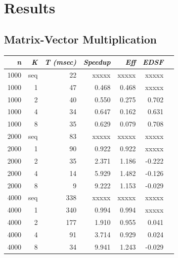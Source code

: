 \documentclass{dependencies/acm_proc_article-sp}
\begin{document}
\section{Results}

\subsection{Matrix-Vector Multiplication}

\begin{center}
\begin{tabular}{|r|r|r|r|r|r|r|}\hline
{\em n} & {\em K} & {\em T (msec)} & {\em Speedup} & {\em Eff} & {\em EDSF} \\\hline
1000    & seq     &  22        & xxxxx       & xxxxx   & xxxxx     \\\hline
1000    & 1       &  47        & 0.468       & 0.468   & xxxxx     \\\hline
1000    & 2       &  40        & 0.550       & 0.275   & 0.702     \\\hline
1000    & 4       &  34        & 0.647       & 0.162   & 0.631     \\\hline
1000    & 8       &  35        & 0.629       & 0.079   & 0.708     \\\hline
2000    & seq     &  83        & xxxxx       & xxxxx   & xxxxx     \\\hline
2000    & 1       &  90        & 0.922       & 0.922   & xxxxx    \\\hline
2000    & 2       &  35        & 2.371       & 1.186   & -0.222    \\\hline
2000    & 4       &  14        & 5.929       & 1.482   & -0.126    \\\hline
2000    & 8       &   9        & 9.222       & 1.153   & -0.029    \\\hline
4000    & seq     &  338       & xxxxx       & xxxxx   & xxxxx     \\\hline
4000    & 1       &  340       & 0.994       & 0.994   & xxxxx     \\\hline
4000    & 2       &  177       & 1.910       & 0.955   & 0.041     \\\hline
4000    & 4       &  91        & 3.714       & 0.929   & 0.024     \\\hline
4000    & 8       &  34        & 9.941       & 1.243   & -0.029    \\\hline
\end{tabular}
\end{center}
\end{document}
